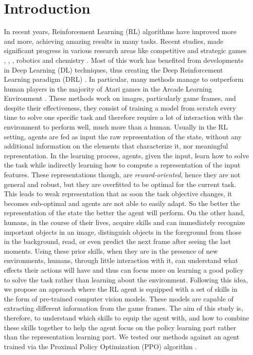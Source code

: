 
\section{Introduction}
\label{sec:introduction}


In recent years, Reinforcement Learning (RL) \cite{sutton1998introduction} algorithms have improved more and more, achieving amazing results in many tasks.
Recent studies, made significant progress in various research areas like competitive and strategic games \cite{mnih2013playing}, \cite{badia2020agent57}, \cite{vinyals2019grandmaster}, robotics \cite{bousmalis2023robocat} and chemistry \cite{varadi2022alphafold}.
Most of this work has benefited from developments in Deep Learning (DL) techniques, thus creating the Deep Reinforcement Learning paradigm (DRL) \cite{zhang2020deep}.
In particular, many methods manage to outperform human players in the majority of Atari games in the Arcade Learning Environment \cite{bellemare13arcade}.
These methods work on images, particularly game frames, and despite their effectiveness, they consist of training a model from scratch every time to solve one specific task and therefore require a lot of interaction with the environment to perform well, much more than a human.
Usually in the RL setting, agents are fed as input the raw representation of the state, without any additional information on the elements that characterize it, nor meaningful representation. In the learning process, agents, given the input, learn how to solve the task while indirectly learning how to compute a representation of the input features. These representations though, are \textit{reward-oriented}, hence they are not general and robust, but they are overfitted to be optimal for the current task. This leads to weak representation that as soon the task objective changes, it becomes sub-optimal and agents are not able to easily adapt. So the better the representation of the state the better the agent will perform.
On the other hand, humans, in the course of their lives, acquire skills and can immediately recognize important objects in an image, distinguish objects in the foreground from those in the background, read, or even predict the next frame after seeing the last moments.
Using these prior skills, when they are in the presence of new environments, humans, through little interaction with it, can understand what effects their actions will have and thus can focus more on learning a good policy to solve the task rather than learning about the environment.
Following this idea, we propose an approach where the RL agent is equipped with a set of skills in the form of pre-trained computer vision models. These models are capable of extracting different information from the game frames.
The aim of this study is, therefore, to understand which skills to equip the agent with, and how to combine these skills together to help the agent focus on the policy learning part rather than the representation learning part.
We tested our methods against an agent trained via the Proximal Policy Optimization (PPO) algorithm \cite{schulman2017proximal}.


